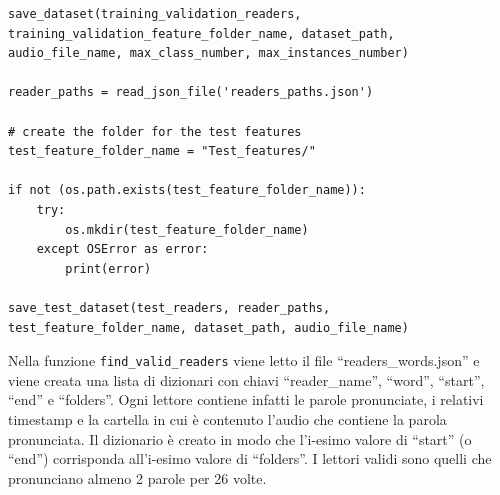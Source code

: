 \documentclass[12pt,a4paper,titlepage]{article}
\begin{document}
\begin{lstlisting}[language=iPython,firstnumber=262, caption=preprocessing.py, label=preprocessing,captionpos=b]
save_dataset(training_validation_readers, training_validation_feature_folder_name, dataset_path, audio_file_name, max_class_number, max_instances_number)

reader_paths = read_json_file('readers_paths.json')

# create the folder for the test features
test_feature_folder_name = "Test_features/"

if not (os.path.exists(test_feature_folder_name)):
    try:
        os.mkdir(test_feature_folder_name)
    except OSError as error:
        print(error)   

save_test_dataset(test_readers, reader_paths, test_feature_folder_name, dataset_path, audio_file_name)
\end{lstlisting}

Nella funzione \texttt{find\_valid\_readers} viene letto il file ``readers\_words.json'' e viene creata una lista di dizionari con chiavi ``reader\_name'', ``word'', ``start'', ``end'' e ``folders''. Ogni lettore contiene infatti le parole pronunciate, i relativi timestamp e la cartella in cui è contenuto l'audio che contiene la parola pronunciata. Il dizionario è creato in modo che l'i-esimo valore di ``start'' (o ``end'') corrisponda all'i-esimo valore di ``folders''. I lettori validi sono quelli che pronunciano almeno 2 parole per 26 volte.
\end{document}
